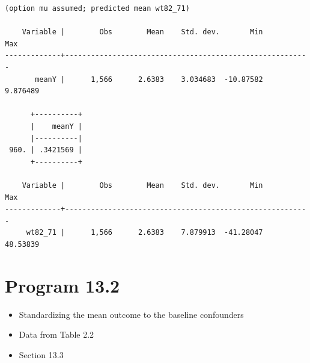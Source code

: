 \documentclass[
  10pt,
  a4paper,
]{book}
\providecommand{\tightlist}{%
  \setlength{\itemsep}{0pt}\setlength{\parskip}{0pt}}
\begin{document}
\begin{verbatim}
(option mu assumed; predicted mean wt82_71)

    Variable |        Obs        Mean    Std. dev.       Min        Max
-------------+---------------------------------------------------------
       meanY |      1,566      2.6383    3.034683  -10.87582   9.876489

      +----------+
      |    meanY |
      |----------|
 960. | .3421569 |
      +----------+

    Variable |        Obs        Mean    Std. dev.       Min        Max
-------------+---------------------------------------------------------
     wt82_71 |      1,566      2.6383    7.879913  -41.28047   48.53839
\end{verbatim}

\section{Program 13.2}\label{program-13.2-1}

\begin{itemize}
\tightlist
\item
  Standardizing the mean outcome to the baseline confounders
\item
  Data from Table 2.2
\item
  Section 13.3
\end{itemize}
\end{document}
